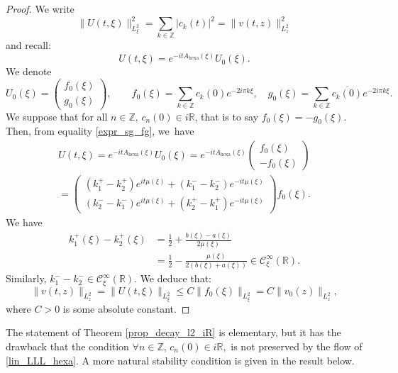 \documentclass[JEP,XML,SOM,Unicode,NoFloatCountersInSection,published]{cedram}
\theoremstyle{definition}
\newcommand\R{\mathbb R}
\newcommand\Z{\mathbb Z}
\begin{document}
\begin{proof}
We write
\begin{equation*}
\|{U}(t,\xi) \|^2_{L_\xi^2} = \sum_{k\in\Z} |c_k(t)|^2 = \|v(t,z)\|^2_{L^2_z}
\end{equation*}
and recall:
\[
{U}(t,\xi) = e^{-itA_{\mathrm{hexa}}(\xi) }{U_0}(\xi).
\]
We denote
\[
{U_0}(\xi) = \begin{pmatrix} {f}_0(\xi) \\ {g}_0(\xi)\end{pmatrix}, \qquad {f}_0(\xi) = \sum_{k\in\Z} c_k(0)e^{- 2i\pi k \xi}, \quad {g}_0(\xi) = \sum_{k\in\Z} \overline{c_k(0)}e^{- 2i\pi k \xi}.
\]
We suppose that for all $n \in \Z, \, c_n(0) \in i\R$, that is to say ${f}_0(\xi) = -{g}_0(\xi)$. Then, from equality \eqref{expr_sg_fg}, we~have
\begin{multline*}
{U}(t,\xi)= e^{-itA_{\mathrm{hexa}}(\xi) }{U_0}(\xi) = e^{-it A_{\mathrm{hexa}}(\xi) }\begin{pmatrix} {f}_0(\xi) \\[2pt] -{f}_0(\xi) \end{pmatrix} \\
=\begin{pmatrix} (k_1^{+}-k_{2}^{+})e^{it\mu(\xi)} + (k_{1}^{-}-k_2^{-})e^{-it\mu(\xi)} \\[4pt] (k_2^{-}-k_1^{-})e^{it\mu(\xi)} + (k_{2}^{+}-k_{1}^{+})e^{-it\mu(\xi)}\end{pmatrix}{f}_0(\xi).
\end{multline*}
We have
\begin{align*}
k_1^{+}(\xi)-k_{2}^{+}(\xi) & = \frac12 + \frac{b(\xi)-a(\xi)}{2\mu(\xi)} \\[4pt]
& = \frac12 - \frac{\mu(\xi)}{2(b(\xi)+a(\xi))} \in \mathcal{C}_{\xi}^\infty(\R).
\end{align*}
Similarly, $k_1^{-}-k_{2}^{-}\in \mathcal{C}_{\xi}^\infty(\R)$.
We deduce that:
\begin{equation*}
\| v(t,z)\|_{L_z^2} = \|{U}(t,\xi) \|_{L_\xi^2} \leq C\|{f}_0(\xi)\|_{L_\xi^2} = C \|v_0(z)\|_{L_z^2},
\end{equation*}
where $C > 0$ is some absolute constant.
\end{proof}

The statement of Theorem \ref{prop_decay_l2_iR} is elementary, but it has the drawback that the condition $ \forall n \in \Z$, $c_n(0) \in i\R, $ is not preserved by the flow of \eqref{lin_LLL_hexa}. A more natural stability condition is given in the result below.
\end{document}
